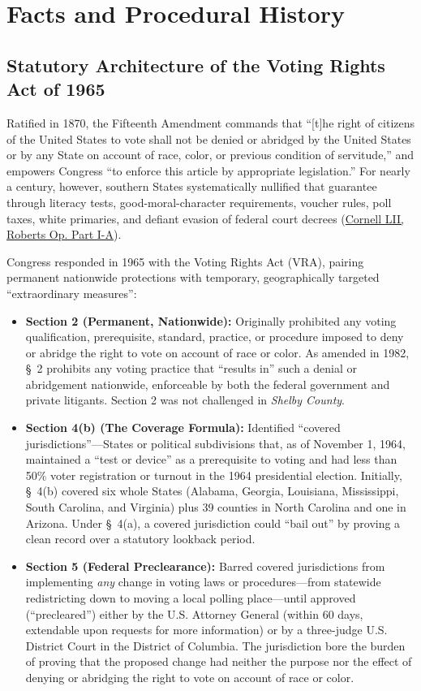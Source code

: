 \documentclass[12pt]{article}
\begin{document}
\section{Facts and Procedural History}

\subsection{Statutory Architecture of the Voting Rights Act of 1965}
Ratified in 1870, the Fifteenth Amendment commands that ``[t]he right of citizens of the United States to vote shall not be denied or abridged by the United States or by any State on account of race, color, or previous condition of servitude,'' and empowers Congress ``to enforce this article by appropriate legislation.'' For nearly a century, however, southern States systematically nullified that guarantee through literacy tests, good-moral-character requirements, voucher rules, poll taxes, white primaries, and defiant evasion of federal court decrees (\href{https://www.law.cornell.edu/supremecourt/text/12-96}{Cornell LII, Roberts Op. Part I-A}).

Congress responded in 1965 with the Voting Rights Act (VRA), pairing permanent nationwide protections with temporary, geographically targeted ``extraordinary measures'':
\begin{itemize}
    \item \textbf{Section 2 (Permanent, Nationwide):} Originally prohibited any voting qualification, prerequisite, standard, practice, or procedure imposed to deny or abridge the right to vote on account of race or color. As amended in 1982, \S~2 prohibits any voting practice that ``results in'' such a denial or abridgement nationwide, enforceable by both the federal government and private litigants. Section 2 was not challenged in \emph{Shelby County}.
    \item \textbf{Section 4(b) (The Coverage Formula):} Identified ``covered jurisdictions''---States or political subdivisions that, as of November 1, 1964, maintained a ``test or device'' as a prerequisite to voting and had less than 50\% voter registration or turnout in the 1964 presidential election. Initially, \S~4(b) covered six whole States (Alabama, Georgia, Louisiana, Mississippi, South Carolina, and Virginia) plus 39 counties in North Carolina and one in Arizona. Under \S~4(a), a covered jurisdiction could ``bail out'' by proving a clean record over a statutory lookback period.
    \item \textbf{Section 5 (Federal Preclearance):} Barred covered jurisdictions from implementing \emph{any} change in voting laws or procedures---from statewide redistricting down to moving a local polling place---until approved (``precleared'') either by the U.S. Attorney General (within 60 days, extendable upon requests for more information) or by a three-judge U.S. District Court in the District of Columbia. The jurisdiction bore the burden of proving that the proposed change had neither the purpose nor the effect of denying or abridging the right to vote on account of race or color.
\end{itemize}
\end{document}
